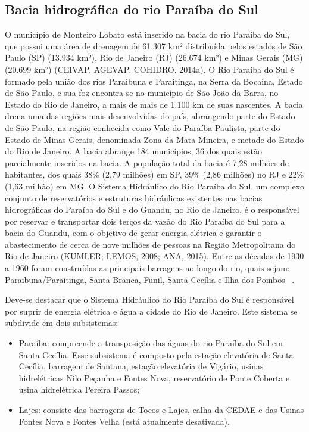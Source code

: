 \subsection{Bacia hidrográfica do rio Paraíba do Sul}
O município de Monteiro Lobato está inserido na bacia do rio Paraíba do Sul, que possui uma área de drenagem de 61.307 km² distribuída pelos estados de São Paulo (SP) (13.934 km²), Rio de Janeiro (RJ) (26.674 km²) e Minas Gerais (MG) (20.699 km²) (CEIVAP, AGEVAP, COHIDRO, 2014a). O Rio Paraíba do Sul é formado pela união dos rios Paraibuna e Paraitinga, na Serra da Bocaina, Estado de São Paulo, e sua foz encontra-se no município de São João da Barra, no Estado do Rio de Janeiro, a mais de mais de 1.100 km de suas nascentes. A bacia drena uma das regiões mais desenvolvidas do país, abrangendo parte do Estado de São Paulo, na região conhecida como Vale do Paraíba Paulista, parte do Estado de Minas Gerais, denominada Zona da Mata Mineira, e metade do Estado do Rio de Janeiro. A bacia abrange 184 municípios, 36 dos quais estão parcialmente inseridos na bacia. A população  total da bacia é 7,28 milhões de habitantes, dos quais 38\% (2,79 milhões) em SP, 39\% (2,86 milhões) no RJ e 22\% (1,63 milhão) em MG. O Sistema Hidráulico do Rio Paraíba do Sul, um complexo conjunto de reservatórios e estruturas hidráulicas existentes nas bacias hidrográficas do Paraíba do Sul e do Guandu, no Rio de Janeiro, é o responsável por reservar e transportar dois terços da vazão do Rio Paraíba do Sul para a bacia do Guandu, com o objetivo de gerar energia elétrica e garantir o abastecimento de cerca de nove milhões de pessoas na Região Metropolitana do Rio de Janeiro (KUMLER; LEMOS, 2008; ANA, 2015). Entre as décadas de 1930 a 1960 foram construídas as principais barragens ao longo do rio, quais sejam: Paraibuna/Paraitinga, Santa Branca, Funil, Santa Cecília e Ilha dos Pombos ~\cite{ANA2017}.

Deve-se destacar que o Sistema Hidráulico do Rio Paraíba do Sul é responsável por suprir de energia elétrica e água a cidade do Rio de Janeiro. Este sistema se subdivide em dois subsistemas:

\begin{itemize}
	\item Paraíba: compreende a transposição das águas do rio Paraíba do Sul em Santa Cecília. Esse subsistema é composto pela estação elevatória de Santa Cecília, barragem de Santana, estação elevatória de Vigário, usinas hidrelétricas Nilo Peçanha e Fontes Nova, reservatório de Ponte Coberta e usina hidrelétrica Pereira Passos;
	\item Lajes: consiste das barragens de Tocos e Lajes, calha da CEDAE e das Usinas Fontes Nova e Fontes Velha (está atualmente desativada).
\end{itemize}
